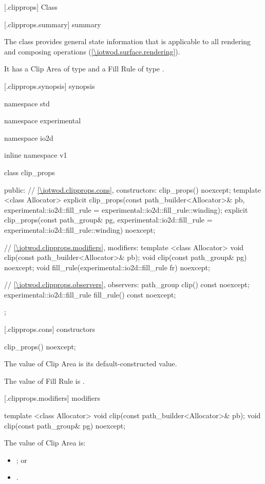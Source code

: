 
 [\iotwod.clipprops] {Class }

 [\iotwod.clipprops.summary] { summary}

\pnum
The  class provides general state information that is applicable to all rendering and composing operations (\ref{\iotwod.surface.rendering}).

\pnum
It has a Clip Area of type  and a Fill Rule of type .

 [\iotwod.clipprops.synopsis] { synopsis}

\begin{codeblock}
namespace std { namespace experimental { namespace io2d { inline namespace v1 {
  class clip_props {
  public:
    // \ref{\iotwod.clipprops.cons}, constructors:
    clip_props() noexcept;
    template <class Allocator>
    explicit clip_props(const path_builder<Allocator>& pb,
      experimental::io2d::fill_rule = experimental::io2d::fill_rule::winding);
    explicit clip_props(const path_group& pg, experimental::io2d::fill_rule =
      experimental::io2d::fill_rule::winding) noexcept;

    // \ref{\iotwod.clipprops.modifiers}, modifiers:
    template <class Allocator>
    void clip(const path_builder<Allocator>& pb);
    void clip(const path_group& pg) noexcept;
    void fill_rule(experimental::io2d::fill_rule fr) noexcept;
    
    // \ref{\iotwod.clipprops.observers}, observers:
    path_group clip() const noexcept;
    experimental::io2d::fill_rule fill_rule() const noexcept;
  };
}}}}
\end{codeblock}

 [\iotwod.clipprops.cons] { constructors}

\begin{itemdecl}
clip_props() noexcept;
\end{itemdecl}
\begin{itemdescr}
\pnum
\effects
The value of Clip Area is its default-constructed value.

\pnum
The value of Fill Rule is .
\end{itemdescr}

 [\iotwod.clipprops.modifiers] { modifiers}

\begin{itemdecl}
template <class Allocator>
void clip(const path_builder<Allocator>& pb);
void clip(const path_group& pg) noexcept;
\end{itemdecl}
\begin{itemdescr}
\pnum
\effects
The value of Clip Area is:
\begin{itemize}
\item {}; or
\item {}.
\end{itemize}
\end{itemdescr}

